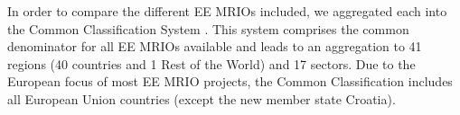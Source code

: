 In order to compare the different EE MRIOs included, we aggregated each into the Common Classification System \cite{Steen_Olsen_2014}. This system comprises the common denominator for all EE MRIOs available and leads to an aggregation to 41 regions (40 countries and 1 Rest of the World) and 17 sectors. Due to the European focus of most EE MRIO projects, the Common Classification includes all European Union countries (except the new member state Croatia).